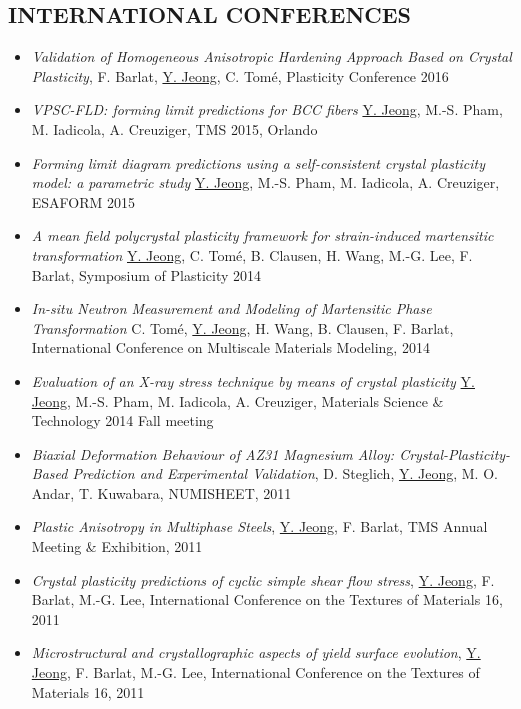 \documentclass{res}
\begin{document}
\begin{resume}
  \section{INTERNATIONAL CONFERENCES}
  \begin{itemize}
  \item {\it Validation of Homogeneous Anisotropic Hardening Approach Based on Crystal Plasticity}, F. Barlat, \underline{Y. Jeong}, C. Tom\'{e}, Plasticity Conference 2016
  \item {\it VPSC-FLD: forming limit predictions for BCC fibers} \underline{Y. Jeong}, M.-S. Pham, M. Iadicola, A. Creuziger, TMS 2015, Orlando
  \item {\it Forming limit diagram predictions using a self-consistent crystal plasticity model: a parametric study} \underline{Y. Jeong}, M.-S. Pham, M. Iadicola, A. Creuziger, ESAFORM 2015
  \item {\it A mean field polycrystal plasticity framework for strain-induced martensitic transformation} \underline{Y. Jeong}, C. Tom\'{e}, B. Clausen, H. Wang, M.-G. Lee, F. Barlat, Symposium of Plasticity 2014
  \item {\it In-situ Neutron  Measurement and Modeling of Martensitic Phase Transformation} C. Tom\'{e}, \underline{Y. Jeong}, H. Wang, B. Clausen, F. Barlat, International Conference on Multiscale Materials Modeling, 2014
  \item {\it Evaluation of an X-ray stress technique by means of crystal plasticity} \underline{Y. Jeong}, M.-S. Pham, M. Iadicola, A. Creuziger, Materials Science \& Technology 2014 Fall meeting
  \item {\it Biaxial Deformation Behaviour of AZ31 Magnesium Alloy: Crystal-Plasticity-Based Prediction and Experimental Validation}, D. Steglich, \underline{Y. Jeong}, M. O. Andar, T. Kuwabara, NUMISHEET, 2011
  \item {\it Plastic Anisotropy in Multiphase Steels}, \underline{Y. Jeong}, F. Barlat, TMS Annual Meeting \& Exhibition, 2011
  \item {\it Crystal plasticity predictions of cyclic simple shear flow stress}, \underline{Y. Jeong}, F. Barlat, M.-G. Lee, International Conference on the Textures of Materials 16, 2011
  \item {\it Microstructural and crystallographic aspects of yield surface evolution}, \underline{Y. Jeong}, F. Barlat, M.-G. Lee, International Conference on the Textures of Materials 16, 2011
  \end{itemize}


\end{resume}
\end{document}
